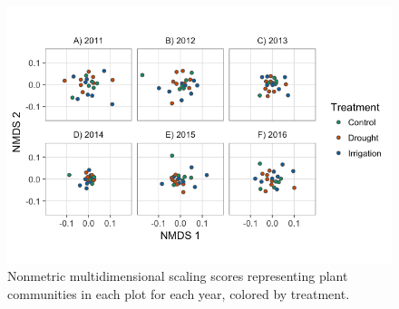 \documentclass[fleqn,10pt,lineno]{wlpeerj} %
\begin{document}
\begin{figure}[!ht]
  \centering
      \includegraphics[width=5in]{../figures/sppcomp_bray_all.png}
  \caption{Nonmetric multidimensional scaling scores representing plant communities in each plot for each year, colored by treatment. }
\end{figure}

\newpage{}



\end{document}
